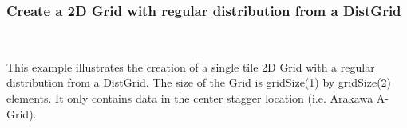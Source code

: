  
\setlength{\oldparskip}{\parskip}
\setlength{\parskip}{1.5ex}
\setlength{\oldparindent}{\parindent}
\setlength{\parindent}{0pt}
\setlength{\oldbaselineskip}{\baselineskip}
\setlength{\baselineskip}{11pt}
 
\def\bv{\begin{verbatim}}
\def\ev{\end{verbatim}}
\def\be{\begin{equation}}
\def\ee{\end{equation}}
\def\bea{\begin{eqnarray}}
\def\eea{\end{eqnarray}}
\def\bi{\begin{itemize}}
\def\ei{\end{itemize}}
\def\bn{\begin{enumerate}}
\def\en{\end{enumerate}}
\def\bd{\begin{description}}
\def\ed{\end{description}}
\def\({\left (}
\def\){\right )}
\def\[{\left [}
\def\]{\right ]}
\def\<{\left  \langle}
\def\>{\right \rangle}
\def\cI{{\cal I}}
\def\diag{\mathop{\rm diag}}
\def\tr{\mathop{\rm tr}}


 

   \subsubsection{Create a 2D Grid with regular distribution from a DistGrid}~\label{sec:usage:ex:adv:reg}
  
   This example illustrates the creation of a single tile 2D Grid
   with a regular distribution from a DistGrid.  The size of the Grid is
   gridSize(1) by gridSize(2) elements. It only contains data
   in the center stagger location (i.e. Arakawa A-Grid). 

